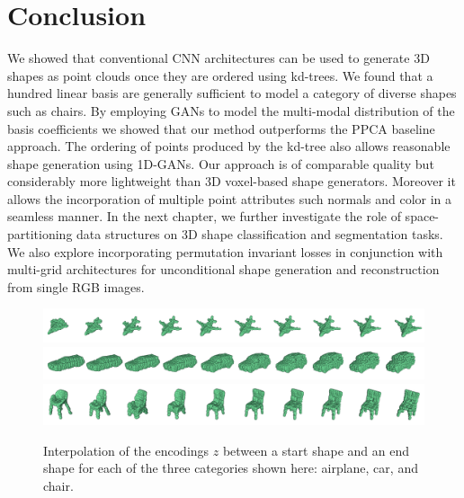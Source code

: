 \section{Conclusion} \label{sec:conclusion}
We showed that conventional CNN architectures can be used to generate 3D shapes as point clouds once they are ordered using kd-trees.
We found that a hundred linear basis are generally sufficient to model a category of diverse shapes such as chairs.
By employing GANs to model the multi-modal distribution of the basis coefficients we showed that our method outperforms the PPCA baseline approach.
The ordering of points produced by the kd-tree also allows reasonable shape generation using 1D-GANs.
Our approach is of comparable quality but considerably more lightweight than 3D voxel-based shape generators.
Moreover it allows the incorporation of multiple point attributes such normals and color in a seamless manner.
In the next chapter, we further investigate the role of space-partitioning data structures on 3D shape classification and segmentation tasks.
We also explore incorporating permutation invariant losses in conjunction with multi-grid architectures
for unconditional shape generation and reconstruction from single RGB images.
\begin{figure}[h]
\includegraphics[width=1.0\linewidth]{PCAGAN/images/airplane_interpolation2.png}
\includegraphics[width=1.0\linewidth]{PCAGAN/images/car_interpolation2.png}
\includegraphics[width=1.0\linewidth]{PCAGAN/images/chair_interpolation2.png}
\vspace{-16pt}
\caption{\small \label{fig:interpolation} Interpolation of the encodings $z$ between a start shape and an end shape for each of the three categories shown here: airplane, car, and chair.}
\vspace{-12pt}
\end{figure}
